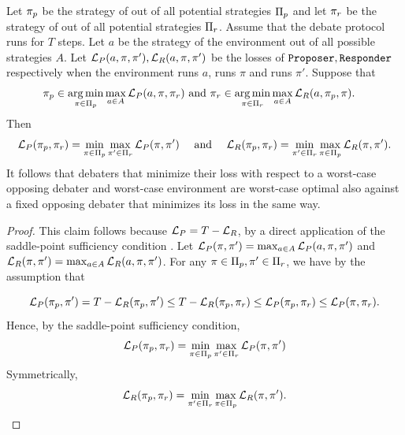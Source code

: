 \documentclass[anon]{alt2027} %
\DeclareMathOperator*{\argmin}{arg\,min}
\begin{document}
\begin{lemma}\label{lem:equilibrium}
    Let $\pi_{p}$ be the strategy of \dt out of all potential strategies $\Pi_{p}$ and let $\pi_{r}$ be the strategy of \df out of all potential strategies $\Pi_{r}$. Assume that the debate protocol runs for $T$ steps. Let $a$ be the strategy of the environment out of all possible strategies $A$. 
    Let ${{\mathcal L}_P}(a, \pi,\pi'), {{\mathcal L}_R}(a,\pi,\pi')$ be the losses of $\texttt{Proposer},\texttt{Responder}$ respectively when the environment runs $a$, \dt runs $\pi$ and \df runs $\pi'$. 
    Suppose that 
    \begin{align*}
            &\pi_\ct \in \argmin_{\pi \in \Pi_\ct} \max_{a \in A} \tLo(a,\pi,\pi_\cf)\text{     and }
    \pi_\cf \in \argmin_{\pi \in \Pi_\cf} \max_{a \in A} \fLo(a,\pi_\ct,\pi).
    \end{align*}
    Then 
    \[
   {{\mathcal L}_P}(\pi_{p}, \pi_{r})
    = \min_{\pi \in \Pi_{p}}\max_{\pi'\in \Pi_{r}}{{\mathcal L}_P}(\pi,\pi')
\quad \text{ and }\quad
{{\mathcal L}_R}(\pi_{p}, \pi_{r})
 =    \min_{\pi' \in \Pi_{r}}\max_{\pi\in \Pi_{p}}{{\mathcal L}_R}(\pi,\pi').
    \]
    It follows that debaters that minimize their loss with respect to a worst-case opposing debater and worst-case environment are worst-case optimal also against a fixed opposing debater that minimizes its loss in the same way. 
\end{lemma}
\begin{proof}
    This claim follows because ${{\mathcal L}_P} = T-{{\mathcal L}_R}$, by a direct application of the saddle-point 
sufficiency condition \cite[see, e.g.,][]{boyd2004convex}. Let ${{\mathcal L}_P}(\pi,\pi') = \max_{a \in A} {{\mathcal L}_P}(a,\pi,\pi')$ and ${{\mathcal L}_R}(\pi,\pi') = \max_{a \in A} {{\mathcal L}_R}(a,\pi,\pi')$. For any $\pi \in \Pi_{p},\pi' \in \Pi_{r}$, we have by the assumption that 

\[
{{\mathcal L}_P}(\pi_{p}, \pi') =
    T - {{\mathcal L}_R}(\pi_{p}, \pi')
    \leq 
    T - {{\mathcal L}_R}(\pi_{p}, \pi_{r})
    \leq {{\mathcal L}_P}(\pi_{p}, \pi_{r})
    \leq {{\mathcal L}_P}(\pi, \pi_{r}).
\]
Hence, by the saddle-point 
sufficiency condition,
\[
   {{\mathcal L}_P}(\pi_{p}, \pi_{r})
    = \min_{\pi \in \Pi_{p}}\max_{\pi'\in \Pi_{r}}{{\mathcal L}_P}(\pi,\pi')
\]
Symmetrically,
\[
{{\mathcal L}_R}(\pi_{p}, \pi_{r})
 =    \min_{\pi' \in \Pi_{r}}\max_{\pi\in \Pi_{p}}{{\mathcal L}_R}(\pi,\pi').
    \]
\end{proof}
\end{document}
